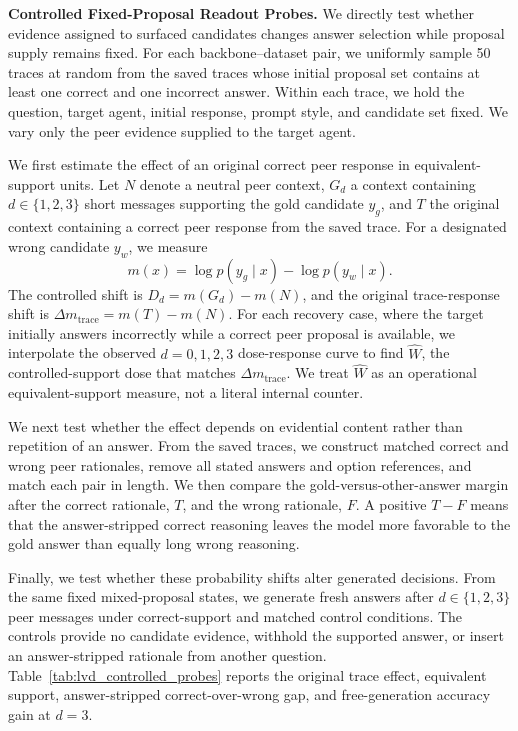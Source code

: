\documentclass{article}
\newcommand{\tabref}[1]{Table~\ref{#1}}
\begin{document}
\label{subsec:controlled_readout_probes}
\textbf{Controlled Fixed-Proposal Readout Probes.}
We directly test whether evidence assigned to surfaced candidates changes
answer selection while proposal supply remains fixed. For each
backbone--dataset pair, we uniformly sample 50 traces at random from the saved
traces whose initial proposal set contains at least one correct and one
incorrect answer. Within each trace, we hold the question, target agent,
initial response, prompt style, and candidate set fixed. We vary only the peer
evidence supplied to the target agent.

We first estimate the effect of an original correct peer response in
equivalent-support units. Let $N$ denote a neutral peer context, $G_d$ a context
containing $d\in\{1,2,3\}$ short messages supporting the gold candidate $y_g$,
and $T$ the original context containing a correct peer response from the saved
trace. For a designated wrong candidate $y_w$, we measure
\[
m(x)=\log p(y_g\mid x)-\log p(y_w\mid x).
\]
The controlled shift is $D_d=m(G_d)-m(N)$, and the original trace-response
shift is $\Delta m_{\mathrm{trace}}=m(T)-m(N)$. For each recovery case, where
the target initially answers incorrectly while a correct peer proposal is
available, we interpolate the observed $d=0,1,2,3$ dose-response curve to find
$\widehat W$, the controlled-support dose that matches
$\Delta m_{\mathrm{trace}}$. We treat $\widehat W$ as an operational
equivalent-support measure, not a literal internal counter.

We next test whether the effect depends on evidential content rather than
repetition of an answer. From the saved traces, we construct matched correct
and wrong peer rationales, remove all stated answers and option references, and
match each pair in length. We then compare the gold-versus-other-answer margin
after the correct rationale, $T$, and the wrong rationale, $F$. A positive
$T-F$ means that the answer-stripped correct reasoning leaves the model more
favorable to the gold answer than equally long wrong reasoning.

Finally, we test whether these probability shifts alter generated decisions.
From the same fixed mixed-proposal states, we generate fresh answers after
$d\in\{1,2,3\}$ peer messages under correct-support and matched control
conditions. The controls provide no candidate evidence, withhold the supported
answer, or insert an answer-stripped rationale from another question.
\tabref{tab:lvd_controlled_probes} reports the original trace
effect, equivalent support, answer-stripped correct-over-wrong gap, and
free-generation accuracy gain at $d=3$.
\end{document}
